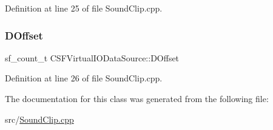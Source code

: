 Definition at line 25 of file Sound\+Clip.\+cpp.

\hypertarget{classCSFVirtualIODataSource_a29db7bf8a3a7103deacb80bf619919c8}{}\label{classCSFVirtualIODataSource_a29db7bf8a3a7103deacb80bf619919c8} 
\subsubsection{\texorpdfstring{D\+Offset}{DOffset}}
{\footnotesize\ttfamily sf\+\_\+count\+\_\+t C\+S\+F\+Virtual\+I\+O\+Data\+Source\+::\+D\+Offset\hspace{0.3cm}{\ttfamily [protected]}}



Definition at line 26 of file Sound\+Clip.\+cpp.



The documentation for this class was generated from the following file\+:\begin{DoxyCompactItemize}
\item 
src/\hyperlink{SoundClip_8cpp}{Sound\+Clip.\+cpp}\end{DoxyCompactItemize}

